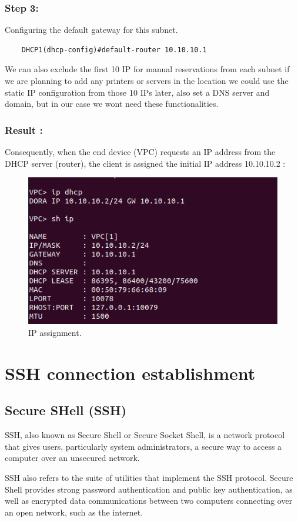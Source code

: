\subsubsection{Step 3:}
Configuring the default gateway for this subnet.
\begin{verbatim}
    DHCP1(dhcp-config)#default-router 10.10.10.1
\end{verbatim}
We can also exclude the first 10 IP for manual reservations from each subnet if we are planning to add any printers or servers in the location we could use the static IP configuration from those 10 IPs later, also set a DNS server and domain, but in our case we wont need these functionalities.

\subsubsection{Result :}
Consequently, when the end device (VPC) requests an IP address from the DHCP server (router), the client is assigned the initial IP address 10.10.10.2 :
\begin{figure}[h]
    \centering
    \includegraphics[width=0.7\linewidth]{Images/VPC_dhcp.png}
    \caption{IP assignment.}
\end{figure}
\section{SSH connection establishment}
\subsection{Secure SHell (SSH)}
SSH, also known as Secure Shell or Secure Socket Shell, is a network protocol that gives users, particularly system administrators, a secure way to access a computer over an unsecured network.

SSH also refers to the suite of utilities that implement the SSH protocol. Secure Shell provides strong password authentication and public key authentication, as well as encrypted data communications between two computers connecting over an open network, such as the internet.

